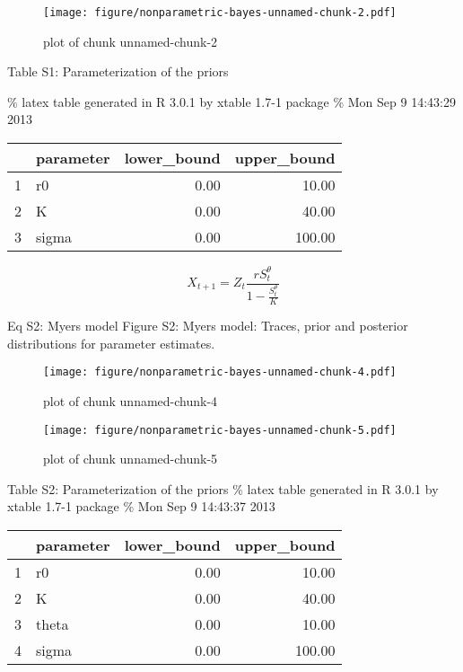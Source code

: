 \documentclass[author-year, review]{elsarticle} %
\makeatletter
\def\maxwidth{\ifdim\Gin@nat@width>\linewidth\linewidth
\else\Gin@nat@width\fi}
\let\Oldincludegraphics\includegraphics
\renewcommand{\includegraphics}[1]{\Oldincludegraphics[width=\maxwidth]{#1}}
\makeatother
\begin{document}
\begin{figure}[htbp]
\centering
\texttt{[image: figure/nonparametric-bayes-unnamed-chunk-2.pdf]}
\caption{plot of chunk unnamed-chunk-2}
\end{figure}

Table S1: Parameterization of the priors

\% latex table generated in R 3.0.1 by xtable 1.7-1 package \% Mon Sep 9
14:43:29 2013

\begin{table}[ht]
\centering
\begin{tabular}{rlrr}
  \hline
 & parameter & lower\_bound & upper\_bound \\ 
  \hline
1 & r0 & 0.00 & 10.00 \\ 
  2 & K & 0.00 & 40.00 \\ 
  3 & sigma & 0.00 & 100.00 \\ 
   \hline
\end{tabular}
\end{table}

\[ X_{t+1} = Z_t \frac{r S_t^{\theta}}{1 - \frac{S_t^\theta}{K}} \]

Eq S2: Myers model Figure S2: Myers model: Traces, prior and posterior
distributions for parameter estimates.

\begin{figure}[htbp]
\centering
\texttt{[image: figure/nonparametric-bayes-unnamed-chunk-4.pdf]}
\caption{plot of chunk unnamed-chunk-4}
\end{figure}

\begin{figure}[htbp]
\centering
\texttt{[image: figure/nonparametric-bayes-unnamed-chunk-5.pdf]}
\caption{plot of chunk unnamed-chunk-5}
\end{figure}

Table S2: Parameterization of the priors \% latex table generated in R
3.0.1 by xtable 1.7-1 package \% Mon Sep 9 14:43:37 2013

\begin{table}[ht]
\centering
\begin{tabular}{rlrr}
  \hline
 & parameter & lower\_bound & upper\_bound \\ 
  \hline
1 & r0 & 0.00 & 10.00 \\ 
  2 & K & 0.00 & 40.00 \\ 
  3 & theta & 0.00 & 10.00 \\ 
  4 & sigma & 0.00 & 100.00 \\ 
   \hline
\end{tabular}
\end{table}
\end{document}

